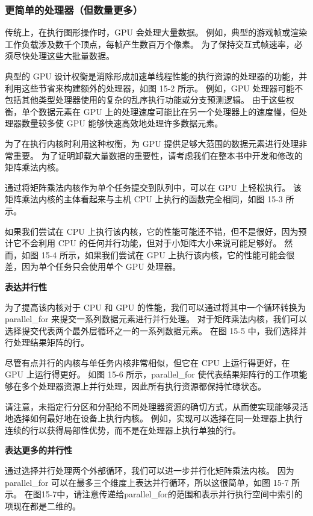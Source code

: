 \subsubsection{更简单的处理器（但数量更多）}
传统上，在执行图形操作时，GPU 会处理大量数据。 例如，典型的游戏帧或渲染工作负载涉及数千个顶点，每帧产生数百万个像素。 为了保持交互式帧速率，必须尽快处理这些大批量数据。

典型的 GPU 设计权衡是消除形成加速单线程性能的执行资源的处理器的功能，并利用这些节省来构建额外的处理器，如图 15-2 所示。 例如，GPU 处理器可能不包括其他类型处理器使用的复杂的乱序执行功能或分支预测逻辑。 由于这些权衡，单个数据元素在 GPU 上的处理速度可能比在另一个处理器上的速度慢，但处理器数量较多使 GPU 能够快速高效地处理许多数据元素。

为了在执行内核时利用这种权衡，为 GPU 提供足够大范围的数据元素进行处理非常重要。 为了证明卸载大量数据的重要性，请考虑我们在整本书中开发和修改的矩阵乘法内核。

通过将矩阵乘法内核作为单个任务提交到队列中，可以在 GPU 上轻松执行。 该矩阵乘法内核的主体看起来与主机 CPU 上执行的函数完全相同，如图 15-3 所示。

如果我们尝试在 CPU 上执行该内核，它的性能可能还不错，但不是很好，因为预计它不会利用 CPU 的任何并行功能，但对于小矩阵大小来说可能足够好。 然而，如图 15-4 所示，如果我们尝试在 GPU 上执行该内核，它的性能可能会很差，因为单个任务只会使用单个 GPU 处理器。

\textbf{表达并行性}

为了提高该内核对于 CPU 和 GPU 的性能，我们可以通过将其中一个循环转换为 parallel\_for 来提交一系列数据元素进行并行处理。 对于矩阵乘法内核，我们可以选择提交代表两个最外层循环之一的一系列数据元素。 在图 15-5 中，我们选择并行处理结果矩阵的行。

尽管有点并行的内核与单任务内核非常相似，但它在 CPU 上运行得更好，在 GPU 上运行得更好。 如图 15-6 所示，parallel\_for 使代表结果矩阵行的工作项能够在多个处理器资源上并行处理，因此所有执行资源都保持忙碌状态。

请注意，未指定行分区和分配给不同处理器资源的确切方式，从而使实现能够灵活地选择如何最好地在设备上执行内核。 例如，实现可以选择在同一处理器上执行连续的行以获得局部性优势，而不是在处理器上执行单独的行。

\textbf{表达更多的并行性}

通过选择并行处理两个外部循环，我们可以进一步并行化矩阵乘法内核。 因为 parallel\_for 可以在最多三个维度上表达并行循环，所以这很简单，如图 15-7 所示。 在图15-7中，请注意传递给parallel\_for的范围和表示并行执行空间中索引的项现在都是二维的。

